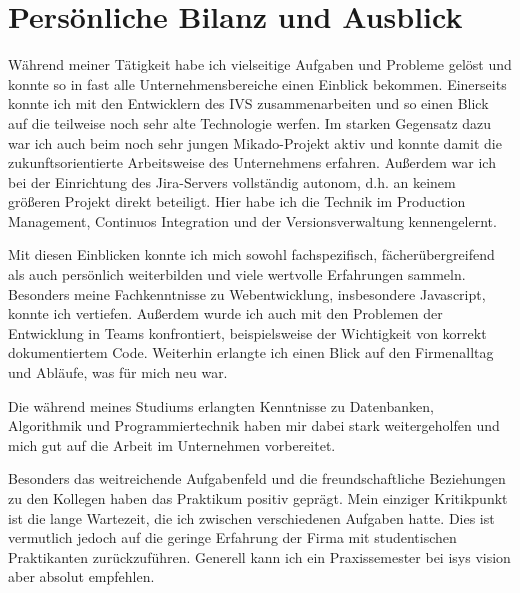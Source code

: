 \chapter{Persönliche Bilanz und Ausblick}
\label{ch:fazit}

Während meiner Tätigkeit habe ich vielseitige Aufgaben und Probleme gelöst und konnte so in fast alle Unternehmensbereiche einen Einblick bekommen. Einerseits konnte ich mit den Entwicklern des IVS zusammenarbeiten und so einen Blick auf die teilweise noch sehr alte Technologie werfen. Im starken Gegensatz dazu war ich auch beim noch sehr jungen Mikado-Projekt aktiv und konnte damit die zukunftsorientierte Arbeitsweise des Unternehmens erfahren. Außerdem war ich bei der Einrichtung des Jira-Servers vollständig autonom, d.h. an keinem größeren Projekt direkt beteiligt. Hier habe ich die Technik im Production Management, Continuos Integration und der Versionsverwaltung kennengelernt.

Mit diesen Einblicken konnte ich mich sowohl fachspezifisch, fächerübergreifend als auch persönlich weiterbilden und viele wertvolle Erfahrungen sammeln. Besonders meine Fachkenntnisse zu Webentwicklung, insbesondere Javascript, konnte ich vertiefen. Außerdem wurde ich auch mit den Problemen der Entwicklung in Teams konfrontiert, beispielsweise der Wichtigkeit von korrekt dokumentiertem Code. Weiterhin erlangte ich einen Blick auf den Firmenalltag und Abläufe, was für mich neu war.

Die während meines Studiums erlangten Kenntnisse zu Datenbanken, Algorithmik und Programmiertechnik haben mir dabei stark weitergeholfen und mich gut auf die Arbeit im Unternehmen vorbereitet.

Besonders das weitreichende Aufgabenfeld und die freundschaftliche Beziehungen zu den Kollegen haben das Praktikum positiv geprägt. Mein einziger Kritikpunkt ist die lange Wartezeit, die ich zwischen verschiedenen Aufgaben hatte. Dies ist vermutlich jedoch auf die geringe Erfahrung der Firma mit studentischen Praktikanten zurückzuführen. Generell kann ich ein Praxissemester bei isys vision aber absolut empfehlen.
